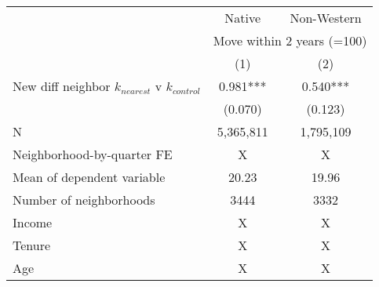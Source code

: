 \begin{tabular}{lcc}
\toprule
 & Native & Non-Western \\ 
\cmidrule(lr){2-2} \cmidrule(lr){3-3}
 & \multicolumn{2}{c}{Move within 2 years (=100)} \\ 
\cmidrule(lr){2-3}
  & (1) & (2) \\ 
\midrule
New diff neighbor $k_{nearest}$ v $k_{control}$ & 0.981*** & 0.540*** \\ 
 & (0.070) & (0.123) \\ 
N & 5,365,811 & 1,795,109 \\ 
Neighborhood-by-quarter FE & X & X \\ 
Mean of dependent variable & 20.23 & 19.96 \\ 
Number of neighborhoods & 3444 & 3332 \\ 
Income & X & X \\ 
Tenure & X & X \\ 
Age & X & X \\ 
\bottomrule
\end{tabular}